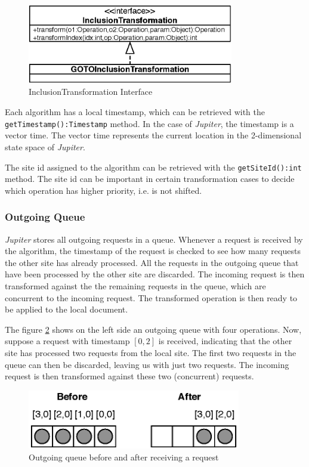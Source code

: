 \begin{figure}
\centering
\includegraphics[width=9cm,height=3.49cm]{../images/finalreport/algorithm_transformation.eps}
\caption{InclusionTransformation Interface}
\label{fig:algorithm.transformation.uml}
\end{figure}

Each algorithm has a local timestamp, which can be retrieved with the
\texttt{getTimestamp():Timestamp} method. In the 
case of \emph{Jupiter}, the timestamp is a vector time. The vector 
time represents the current location in the 2-dimensional state space of 
\emph{Jupiter}. 

The site id assigned to the algorithm can be retrieved with the
\texttt{getSiteId():int} method. The site id can be important in certain
transformation cases to decide which operation has higher priority, i.e.
is not shifted.

\subsubsection{Outgoing Queue}
\label{sect:algorithm.outgoingqueue}
\emph{Jupiter} stores all outgoing requests in a queue. Whenever a request
is received by the algorithm, the timestamp of the request is checked to
see how many requests the other site has already processed. All the requests
in the outgoing queue that have been processed by the other site are discarded.
The incoming request is then transformed against the the remaining 
requests in the queue, which are concurrent to the incoming request. 
The transformed operation is then ready to be applied to the
local document.

The figure \ref{fig:algorithm.outqueue} shows on the left side an outgoing
queue with four operations. Now, suppose a request with timestamp $[0,2]$
is received, indicating that the other site has processed two requests
from the local site. The first two requests in the queue can then be
discarded, leaving us with just two requests. The incoming request is then
transformed against these two (concurrent) requests.

\begin{figure}[H]
\centering
\includegraphics[width=9.31cm,height=2.58cm]{../images/finalreport/algorithm_outqueue.eps}
\caption{Outgoing queue before and after receiving a request}
\label{fig:algorithm.outqueue}
\end{figure}


